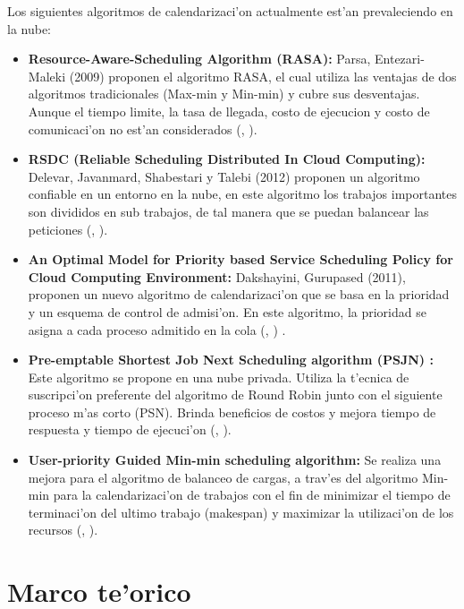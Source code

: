 Los siguientes algoritmos de calendarizaci'on actualmente est'an prevaleciendo en la nube:
\begin{itemize}
	\item \textbf{Resource-Aware-Scheduling Algorithm (RASA):} Parsa, Entezari-Maleki (2009) proponen el algoritmo RASA, el cual utiliza las ventajas de dos algoritmos tradicionales (Max-min y Min-min) y cubre sus desventajas. Aunque el tiempo limite, la tasa de llegada, costo de ejecucion y costo de comunicaci'on no est'an considerados (\citeauthor{parsa2009rasa}, \citeyear{parsa2009rasa}).
	
	
	\item \textbf{RSDC (Reliable Scheduling Distributed In Cloud Computing):} Delevar, Javanmard, Shabestari y Talebi (2012) proponen un algoritmo confiable en un entorno en la nube, en este algoritmo los trabajos importantes son divididos en sub trabajos, de tal manera que se puedan balancear las peticiones (\citeauthor{delavar2012rsdc}, \citeyear{delavar2012rsdc}).
	
	
	\item \textbf{An Optimal Model for Priority based Service Scheduling Policy for Cloud Computing Environment:} Dakshayini, Gurupased (2011), proponen un nuevo algoritmo de calendarizaci'on que se basa en la prioridad y un esquema de control de admisi'on. En este algoritmo, la prioridad se asigna a cada proceso admitido en la cola (\citeauthor{dakshayini2011optimal}, \citeyear{dakshayini2011optimal}) . 
	
	
	\item \textbf{Pre-emptable Shortest Job Next Scheduling algorithm (PSJN) :}  Este algoritmo se propone en una nube privada. Utiliza la t'ecnica de suscripci'on preferente del algoritmo de Round Robin junto con el siguiente proceso m'as corto (PSN). Brinda beneficios de costos y mejora tiempo de respuesta y tiempo de ejecuci'on (\citeauthor{nishant}, \citeyear{nishant}). 
	
	
	\item \textbf{User-priority Guided Min-min scheduling algorithm:} Se realiza una mejora para el algoritmo de balanceo de cargas, a trav'es del algoritmo Min-min para la calendarizaci'on de trabajos con el fin de minimizar el tiempo de terminaci'on del ultimo trabajo (makespan) y maximizar la utilizaci'on de los recursos (\citeauthor{chen2013user}, \citeyear{chen2013user}). 
\end{itemize}



\section{Marco te'orico}

